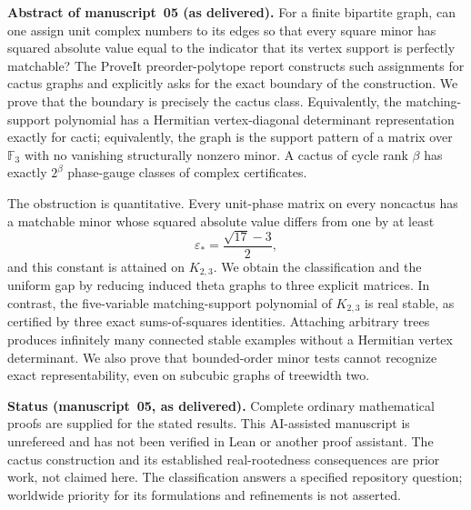 \documentclass[11pt]{article}
\numberwithin{equation}{section}
\theoremstyle{definition}
\newcommand{\F}{\mathbb F}
\newcommand{\epsstar}{\varepsilon_*}
\begin{document}
\begin{tcolorbox}[colback=white,colframe=Pale,arc=1mm]
\small\textbf{Abstract of manuscript~05 (as delivered).}
For a finite bipartite graph, can one assign unit complex numbers to its
edges so that every square minor has squared absolute value equal to the
indicator that its vertex support is perfectly matchable? The ProveIt
preorder-polytope report constructs such assignments for cactus graphs and
explicitly asks for the exact boundary of the construction. We prove that
the boundary is precisely the cactus class. Equivalently, the
matching-support polynomial has a Hermitian vertex-diagonal determinant
representation exactly for cacti; equivalently, the graph is the support
pattern of a matrix over $\F_3$ with no vanishing structurally nonzero
minor. A cactus of cycle rank $\beta$ has exactly $2^\beta$ phase-gauge
classes of complex certificates.

The obstruction is quantitative. Every unit-phase matrix on every noncactus
has a matchable minor whose squared absolute value differs from one by at
least
\[
 \epsstar=\frac{\sqrt{17}-3}{2},
\]
and this constant is attained on $K_{2,3}$. We obtain the classification
and the uniform gap by reducing induced theta graphs to three explicit
matrices. In contrast, the five-variable matching-support polynomial of
$K_{2,3}$ is real stable, as certified by three exact sums-of-squares
identities. Attaching arbitrary trees produces infinitely many connected
stable examples without a Hermitian vertex determinant. We also prove that
bounded-order minor tests cannot recognize exact representability, even on
subcubic graphs of treewidth two.
\end{tcolorbox}

\begin{statusbox}
\small\textbf{Status (manuscript~05, as delivered).} Complete ordinary
mathematical proofs are supplied for the stated results. This AI-assisted
manuscript is unrefereed and has not been verified in Lean or another proof
assistant. The cactus construction and its established real-rootedness
consequences are prior work, not claimed here. The classification answers a
specified repository question; worldwide priority for its formulations and
refinements is not asserted.
\end{statusbox}
\end{document}
